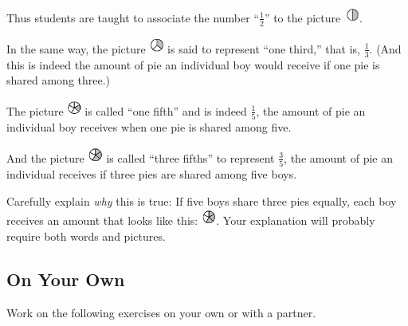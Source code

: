 Thus students are taught to associate the number ``$\frac 1 2$'' to the picture
\includegraphics[height = 15pt]{halfpie}.

In the same way, the picture \includegraphics[height = 15pt]{thirdpie} is said to represent ``one third,'' that is,
$ \frac 1 3$.
(And this is indeed the amount of pie an individual boy would receive if one pie is
shared among three.)


The picture
\includegraphics[height = 15pt]{fifthpie}
 is called ``one fifth'' and is indeed
$\frac 1 5$, the amount of pie an
individual boy receives when one pie is shared among five.
 
And the picture
 \includegraphics[height = 15pt]{3fifthpie}
 is called ``three fifths'' to represent
$\frac 3 5$,
the amount of pie
an individual receives if three pies are shared among five boys.
 
 \begin{thinkpair*}
 Carefully explain \emph{why} this is true: If five boys share three pies equally, each boy receives an amount that looks like this:  \includegraphics[height = 15pt]{3fifthpie}.  Your explanation will probably require both words and pictures.

 \end{thinkpair*}
 
 
\subsection*{On Your Own}
 Work on the following exercises on your own or with a partner.
 
